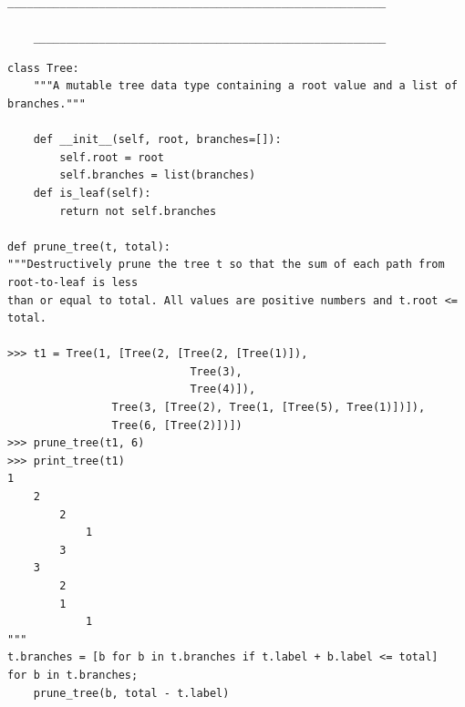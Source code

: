 \documentclass{exam}
\newlength{\currentparskip}
\newenvironment{blocksection}
{
    \setlength{\currentparskip}{\parskip}%
    \begin{minipage}{\linewidth}
    \setlength{\parskip}{\currentparskip}%
}
{
    \end{minipage}
}
\begin{document}
\begin{questions}
\begin{blocksection}
\begin{lstlisting}
__________________________________________________________

    ______________________________________________________
\end{lstlisting}
\end{blocksection}
\begin{solution}
\begin{lstlisting}
class Tree:
    """A mutable tree data type containing a root value and a list of branches."""
    
    def __init__(self, root, branches=[]):
        self.root = root
        self.branches = list(branches)
    def is_leaf(self):
        return not self.branches

def prune_tree(t, total):
"""Destructively prune the tree t so that the sum of each path from root-to-leaf is less
than or equal to total. All values are positive numbers and t.root <= total.

>>> t1 = Tree(1, [Tree(2, [Tree(2, [Tree(1)]),
                            Tree(3),
                            Tree(4)]),
                Tree(3, [Tree(2), Tree(1, [Tree(5), Tree(1)])]),
                Tree(6, [Tree(2)])])
>>> prune_tree(t1, 6)
>>> print_tree(t1)
1
    2
        2
            1
        3
    3
        2
        1
            1
"""
t.branches = [b for b in t.branches if t.label + b.label <= total]
for b in t.branches;
    prune_tree(b, total - t.label)
\end{lstlisting}
\end{solution}
\end{questions}
\end{document}
